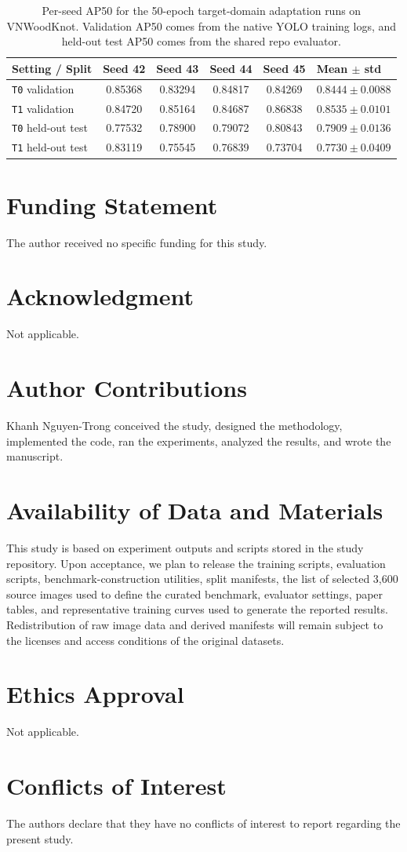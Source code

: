 \documentclass[10pt,a4paper]{article}
\begin{document}
\begin{table}[t]
  \centering
  \caption{Per-seed AP50 for the 50-epoch target-domain adaptation runs on VNWoodKnot. Validation AP50 comes from the native YOLO training logs, and held-out test AP50 comes from the shared repo evaluator.}
  \label{tab:app-transfer-perseed}
  \scriptsize
  \setlength{\tabcolsep}{4pt}
  \begin{tabularx}{\textwidth}{>{\raggedright\arraybackslash}p{} c c c c X}
    \toprule
    Setting / Split & Seed 42 & Seed 43 & Seed 44 & Seed 45 & Mean $\pm$ std \\
    \midrule
    \texttt{T0} validation & 0.85368 & 0.83294 & 0.84817 & 0.84269 & $0.8444 \pm 0.0088$ \\
    \texttt{T1} validation & 0.84720 & 0.85164 & 0.84687 & 0.86838 & $0.8535 \pm 0.0101$ \\
    \texttt{T0} held-out test & 0.77532 & 0.78900 & 0.79072 & 0.80843 & $0.7909 \pm 0.0136$ \\
    \texttt{T1} held-out test & 0.83119 & 0.75545 & 0.76839 & 0.73704 & $0.7730 \pm 0.0409$ \\
    \bottomrule
  \end{tabularx}
\end{table}

\section*{Funding Statement}
The author received no specific funding for this study.

\section*{Acknowledgment}
Not applicable.

\section*{Author Contributions}
Khanh Nguyen-Trong conceived the study, designed the methodology, implemented the code, ran the experiments, analyzed the results, and wrote the manuscript.

\section*{Availability of Data and Materials}
This study is based on experiment outputs and scripts stored in the study repository. Upon acceptance, we plan to release the training scripts, evaluation scripts, benchmark-construction utilities, split manifests, the list of selected 3,600 source images used to define the curated benchmark, evaluator settings, paper tables, and representative training curves used to generate the reported results. Redistribution of raw image data and derived manifests will remain subject to the licenses and access conditions of the original datasets.

\section*{Ethics Approval}
Not applicable.

\section*{Conflicts of Interest}
The authors declare that they have no conflicts of interest to report regarding the present study.



\end{document}
